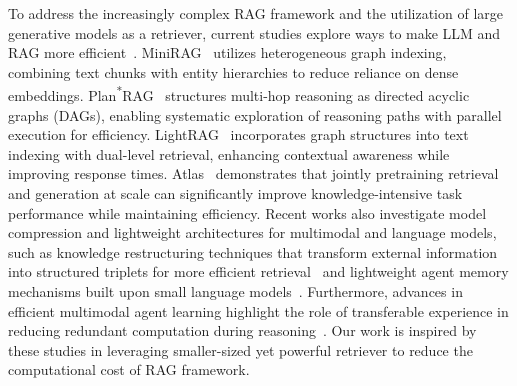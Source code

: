 




To address the increasingly complex RAG framework and the utilization of large generative models as a retriever, current studies explore ways to make LLM and RAG more efficient~\citep{zhou2026look,wang2026stream,wang2026efficient}.
MiniRAG~\citep{fan2025minirag} utilizes heterogeneous graph indexing, combining text chunks with entity hierarchies to reduce reliance on dense embeddings. 
Plan\textsuperscript{*}RAG~\citep{verma2024plan} structures multi-hop reasoning as directed acyclic graphs (DAGs), enabling systematic exploration of reasoning paths with parallel execution for efficiency. 
LightRAG~\citep{guo2024lightrag} incorporates graph structures into text indexing with dual-level retrieval, enhancing contextual awareness while improving response times.
Atlas~\citep{izacard2022atlas} demonstrates that jointly pretraining retrieval and generation at scale can significantly improve knowledge-intensive task performance while maintaining efficiency.
Recent works also investigate model compression and lightweight architectures for multimodal and language models, such as knowledge restructuring techniques that transform external information into structured triplets for more efficient retrieval~\citep{wang2026transforming} and
lightweight agent memory mechanisms built upon small language models~\citep{zhang2026lightweight}.
Furthermore, advances in efficient multimodal agent learning highlight the role of transferable experience in reducing redundant computation during reasoning~\citep{li2026experience}. 
Our work is inspired by these studies in leveraging smaller-sized yet powerful retriever to reduce the computational cost of RAG framework.
